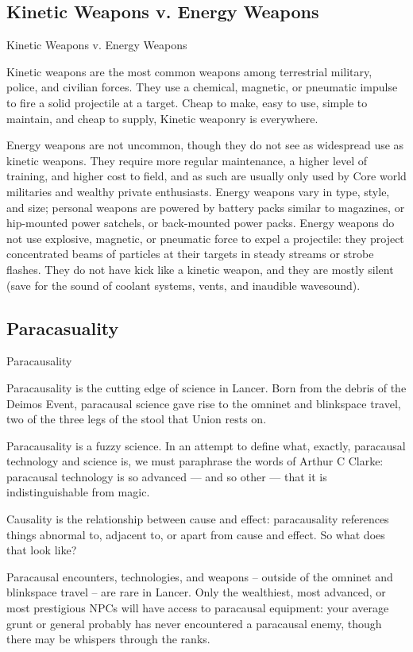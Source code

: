 \subsection{Kinetic Weapons v. Energy Weapons}
Kinetic Weapons v. Energy Weapons  

Kinetic weapons are the most common weapons among terrestrial military, police, and civilian  
forces. They use a chemical, magnetic, or pneumatic impulse to fire a solid projectile at a target.  
Cheap to make, easy to use, simple to maintain, and cheap to supply, Kinetic weaponry is  
everywhere. 
 

Energy weapons are not uncommon, though they do not see as widespread use as kinetic  
weapons. They require more regular maintenance, a higher level of training, and higher cost to  
field, and as such are usually only used by Core world militaries and wealthy private enthusiasts.  
Energy weapons vary in type, style, and size; personal weapons are powered by battery packs  
similar to magazines, or hip-mounted power satchels, or back-mounted power packs. Energy  
weapons do not use explosive, magnetic, or pneumatic force to expel a projectile: they project  
concentrated beams of particles at their targets in steady streams or strobe flashes. They do not  
have kick like a kinetic weapon, and they are mostly silent (save for the sound of coolant  
systems, vents, and inaudible wavesound). 
 
\subsection{Paracasuality}
Paracausality  

Paracausality is the cutting edge of science in Lancer. Born from the debris of the Deimos Event,  
paracausal science gave rise to the omninet and blinkspace travel, two of the three legs of the  
stool that Union rests on. 
 

Paracausality is a fuzzy science. In an attempt to define what, exactly, paracausal technology  
and science is, we must paraphrase the words of Arthur C Clarke: paracausal technology is so  
advanced — and so other — that it is indistinguishable from magic.
 

Causality is the relationship between cause and effect: paracausality references things abnormal  
to, adjacent to, or apart from cause and effect. So what does that look like? 
 

Paracausal encounters, technologies, and weapons -- outside of the omninet and blinkspace  
travel -- are rare in Lancer. Only the wealthiest, most advanced, or most prestigious NPCs will  
have access to paracausal equipment: your average grunt or general probably has never  
encountered a paracausal enemy, though there may be whispers through the ranks. 
 

                                                                                                               


  
